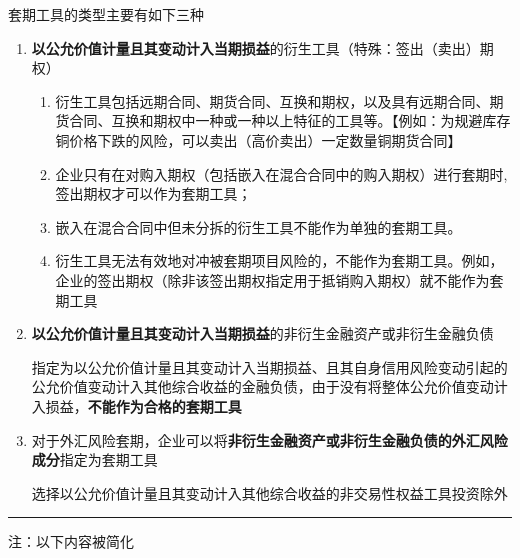 \documentclass[UTF8,12pt]{ctexart}
\numberwithin{equation}{section} %
\numberwithin{figure}{section}
\numberwithin{table}{section}
\begin{document}
	套期工具的类型主要有如下三种
	\begin{enumerate}
		\item \textbf{以公允价值计量且其变动计入当期损益}的衍生工具（特殊：签出（卖出）期权）
		\begin{enumerate}
			\item 衍生工具包括远期合同、期货合同、互换和期权，以及具有远期合同、期货合同、互换和期权中一种或一种以上特征的工具等。【例如：为规避库存铜价格下跌的风险，可以卖出（高价卖出）一定数量铜期货合同】
			
			\item 企业只有在对购入期权（包括嵌入在混合合同中的购入期权）进行套期时,签出期权才可以作为套期工具；
			
			\item 嵌入在混合合同中但未分拆的衍生工具不能作为单独的套期工具。
			
			\item 衍生工具无法有效地对冲被套期项目风险的，不能作为套期工具。例如，企业的签出期权（除非该签出期权指定用于抵销购入期权）就不能作为套期工具
			
		\end{enumerate}
		
		\item \textbf{以公允价值计量且其变动计入当期损益}的非衍生金融资产或非衍生金融负债
		
		指定为以公允价值计量且其变动计入当期损益、且其自身信用风险变动引起的公允价值变动计入其他综合收益的金融负债，由于没有将整体公允价值变动计入损益，\textbf{不能作为合格的套期工具}
		
		\item 对于外汇风险套期，企业可以将\textbf{非衍生金融资产或非衍生金融负债的外汇风险成分}指定为套期工具
		
		选择以公允价值计量且其变动计入其他综合收益的非交易性权益工具投资除外
		
	\end{enumerate}
	
	\vspace{5pt}
	\hrule
	\vspace{5pt}
	注：以下内容被简化
\end{document}
